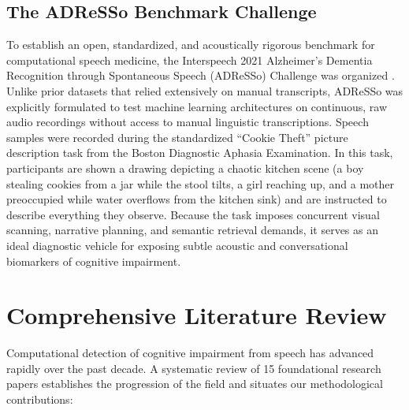 \documentclass[conference]{IEEEtran}
\begin{document}
\subsection{The ADReSSo Benchmark Challenge}
To establish an open, standardized, and acoustically rigorous benchmark for computational speech medicine, the Interspeech 2021 Alzheimer's Dementia Recognition through Spontaneous Speech (ADReSSo) Challenge was organized \cite{luz2021adresso}. Unlike prior datasets that relied extensively on manual transcripts, ADReSSo was explicitly formulated to test machine learning architectures on continuous, raw audio recordings without access to manual linguistic transcriptions. Speech samples were recorded during the standardized ``Cookie Theft'' picture description task from the Boston Diagnostic Aphasia Examination. In this task, participants are shown a drawing depicting a chaotic kitchen scene (a boy stealing cookies from a jar while the stool tilts, a girl reaching up, and a mother preoccupied while water overflows from the kitchen sink) and are instructed to describe everything they observe. Because the task imposes concurrent visual scanning, narrative planning, and semantic retrieval demands, it serves as an ideal diagnostic vehicle for exposing subtle acoustic and conversational biomarkers of cognitive impairment.

\section{Comprehensive Literature Review}

Computational detection of cognitive impairment from speech has advanced rapidly over the past decade. A systematic review of 15 foundational research papers establishes the progression of the field and situates our methodological contributions:
\end{document}
